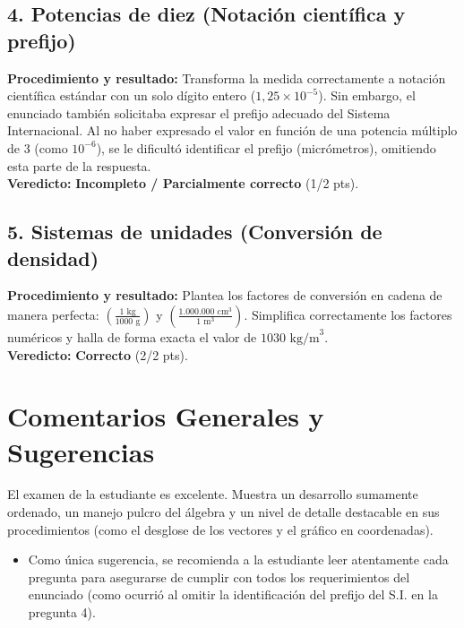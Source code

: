\documentclass[12pt]{article}
\begin{document}
\subsection*{4. Potencias de diez (Notación científica y prefijo)}
\textbf{Procedimiento y resultado:} Transforma la medida correctamente a notación científica estándar con un solo dígito entero ($1,25 \times 10^{-5}$). Sin embargo, el enunciado también solicitaba expresar el prefijo adecuado del Sistema Internacional. Al no haber expresado el valor en función de una potencia múltiplo de 3 (como $10^{-6}$), se le dificultó identificar el prefijo (micrómetros), omitiendo esta parte de la respuesta. \\
\textbf{Veredicto:} \textbf{Incompleto / Parcialmente correcto} (1/2 pts).

\subsection*{5. Sistemas de unidades (Conversión de densidad)}
\textbf{Procedimiento y resultado:} Plantea los factores de conversión en cadena de manera perfecta: $\left(\frac{1 \text{ kg}}{1000 \text{ g}}\right)$ y $\left(\frac{1.000.000 \text{ cm}^3}{1 \text{ m}^3}\right)$. Simplifica correctamente los factores numéricos y halla de forma exacta el valor de $1030 \text{ kg/m}^3$. \\
\textbf{Veredicto:} \textbf{Correcto} (2/2 pts).

\vspace{0.5cm}
\section*{Comentarios Generales y Sugerencias}
El examen de la estudiante es excelente. Muestra un desarrollo sumamente ordenado, un manejo pulcro del álgebra y un nivel de detalle destacable en sus procedimientos (como el desglose de los vectores y el gráfico en coordenadas).
\begin{itemize}
    \item Como única sugerencia, se recomienda a la estudiante leer atentamente cada pregunta para asegurarse de cumplir con todos los requerimientos del enunciado (como ocurrió al omitir la identificación del prefijo del S.I. en la pregunta 4).
\end{itemize}
\end{document}

